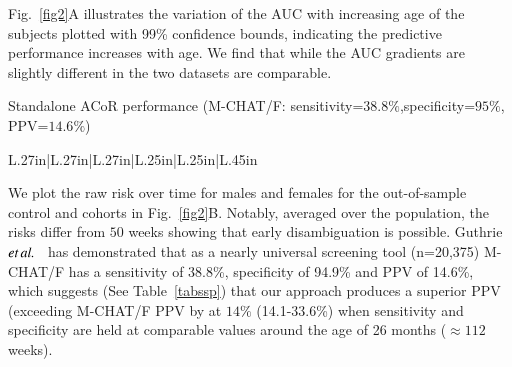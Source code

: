 \documentclass[onecolumn, compsoc,11pt]{IEEEtran}
\renewcommand{\captionN}[1]{\caption{\color{CadetBlue4!80!black} \sffamily \fontsize{9}{10}\selectfont #1  }}
\def\acor{ACoR\xspace}
\begin{document}
%
Fig.~\ref{fig2}A illustrates the variation of the  AUC  with increasing age of the subjects plotted with 99\% confidence bounds, indicating the predictive performance increases with age. We find that while the AUC gradients are slightly different in the two datasets are comparable.

\begin{table}  
  \centering
  \vspace{-19pt}
  
\captionN{Standalone \acor performance (M-CHAT/F: sensitivity=$38.8\%$,specificity=$95\%$, PPV=$14.6\%$)}\label{tabssp}
\fontsize{8}{8}\selectfont
  \vspace{-10pt}
 \begin{tabular}{L{.27in}|L{.27in}|L{.27in}|L{.25in}|L{.25in}|L{.45in}}
\hline

\end{tabular}
\end{table}  
We plot the raw risk over time for males and females for the out-of-sample control and \treatment cohorts in Fig.~\ref{fig2}B. Notably, averaged over the population,   the risks differ  from $50$ weeks showing that early disambiguation is possible. Guthrie $\textit{et} \mspace{3mu} \textit{al.}$~\cite{pmid31562252}  has  demonstrated that  as a nearly universal screening tool (n=20,375) M-CHAT/F has a sensitivity of 38.8\%, specificity of 94.9\% and PPV of 14.6\%, which suggests  (See Table~\ref{tabssp}) that our approach produces a  superior PPV (exceeding M-CHAT/F PPV by at  $14\%$ (14.1-33.6\%) when sensitivity and specificity are held at comparable values around the age of 26 months ($\approx 112$ weeks). 
\end{document}
